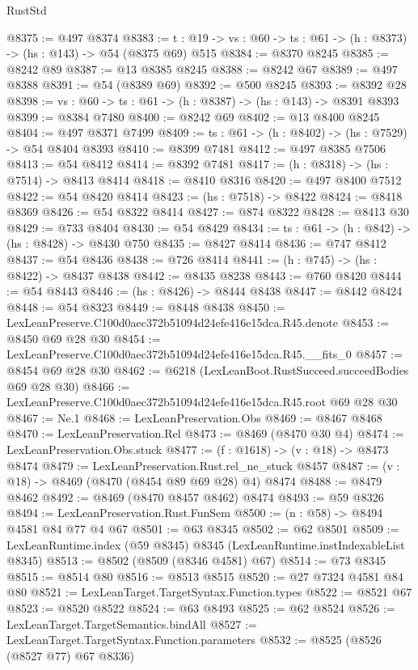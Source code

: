 \begin{lexlean}{RustStd}
\begin{coremodule}
@8375 := @497 @8374
@8383 := {t : @19} -> {vs : @60} -> {ts : @61} -> (h : @8373) -> (hs : @143) -> @54 (@8375 @69) @515
@8384 := @8370 @8245
@8385 := @8242 @89
@8387 := @13 @8385 @8245
@8388 := @8242 @67
@8389 := @497 @8388
@8391 := @54 (@8389 @69)
@8392 := @500 @8245
@8393 := @8392 @28
@8398 := {vs : @60} -> {ts : @61} -> (h : @8387) -> (hs : @143) -> @8391 @8393
@8399 := @8384 @7480
@8400 := @8242 @69
@8402 := @13 @8400 @8245
@8404 := @497 @8371 @7499
@8409 := {ts : @61} -> (h : @8402) -> (hs : @7529) -> @54 @8404 @8393
@8410 := @8399 @7481
@8412 := @497 @8385 @7506
@8413 := @54 @8412
@8414 := @8392 @7481
@8417 := (h : @8318) -> (hs : @7514) -> @8413 @8414
@8418 := @8410 @8316
@8420 := @497 @8400 @7512
@8422 := @54 @8420 @8414
@8423 := (hs : @7518) -> @8422
@8424 := @8418 @8369
@8426 := @54 @8322 @8414
@8427 := @874 @8322
@8428 := @8413 @30
@8429 := @733 @8404
@8430 := @54 @8429
@8434 := {ts : @61} -> (h : @842) -> (hs : @8428) -> @8430 @750
@8435 := @8427 @8414
@8436 := @747 @8412
@8437 := @54 @8436
@8438 := @726 @8414
@8441 := (h : @745) -> (hs : @8422) -> @8437 @8438
@8442 := @8435 @8238
@8443 := @760 @8420
@8444 := @54 @8443
@8446 := (hs : @8426) -> @8444 @8438
@8447 := @8442 @8424
@8448 := @54 @8323
@8449 := @8448 @8438
@8450 := LexLeanPreserve.C100d0aec372b51094d24efe416e15dca.R45.denote
@8453 := @8450 @69 @28 @30
@8454 := LexLeanPreserve.C100d0aec372b51094d24efe416e15dca.R45.__fits_0
@8457 := @8454 @69 @28 @30
@8462 := @6218 (LexLeanBoot.RustSucceed.succeedBodies @69 @28 @30)
@8466 := LexLeanPreserve.C100d0aec372b51094d24efe416e15dca.R45.root @69 @28 @30
@8467 := Ne.{1}
@8468 := LexLeanPreservation.Obs
@8469 := @8467 @8468
@8470 := LexLeanPreservation.Rel
@8473 := @8469 (@8470 @30 @4)
@8474 := LexLeanPreservation.Obs.stuck
@8477 := (f : @1618) -> (v : @18) -> @8473 @8474
@8479 := LexLeanPreservation.Rust.rel_ne_stuck @8457
@8487 := (v : @18) -> @8469 (@8470 (@8454 @89 @69 @28) @4) @8474
@8488 := @8479 @8462
@8492 := @8469 (@8470 @8457 @8462) @8474
@8493 := @59 @8326
@8494 := LexLeanPreservation.Rust.FunSem
@8500 := (n : @58) -> @8494 @4581 @84 @77 @4 @67
@8501 := @63 @8345
@8502 := @62 @8501
@8509 := LexLeanRuntime.index (@59 @8345) @8345 (LexLeanRuntime.instIndexableList @8345)
@8513 := @8502 (@8509 (@8346 @4581) @67)
@8514 := @73 @8345
@8515 := @8514 @80
@8516 := @8513 @8515
@8520 := @27 @7324 @4581 @84 @80
@8521 := LexLeanTarget.TargetSyntax.Function.types
@8522 := @8521 @67
@8523 := @8520 @8522
@8524 := @63 @8493
@8525 := @62 @8524
@8526 := LexLeanTarget.TargetSemantics.bindAll
@8527 := LexLeanTarget.TargetSyntax.Function.parameters
@8532 := @8525 (@8526 (@8527 @77) @67 @8336)

\end{coremodule}
\end{lexlean}

